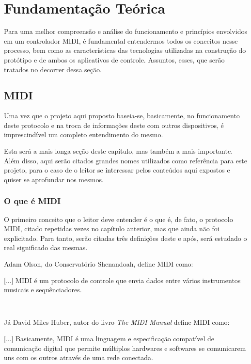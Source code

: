 
\chapter{Fundamentação Teórica}
\label{chap:fundamentacaoTeorica}

    Para uma melhor compreensão e análise do funcionamento e princípios envolvidos em um controlador MIDI, é fundamental entendermos todos os conceitos nesse processo, bem como as características das tecnologias utilizadas na construção do protótipo e de ambos os aplicativos de controle. Assuntos, esses, que serão tratados no decorrer dessa seção.

    \section{MIDI}

        Uma vez que o projeto aqui proposto baseia-se, basicamente, no funcionamento deste protocolo e na troca de informações deste com outros dispositivos, é imprescindível um completo entendimento do mesmo.

        Esta será a mais longa seção deste capítulo, mas também a mais importante. Além disso, aqui serão citados grandes nomes utilizados como referência para este projeto, para o caso de o leitor se interessar pelos conteúdos aqui expostos e quiser se aprofundar nos mesmos.

        \subsection{O que é MIDI}

            O primeiro conceito que o leitor deve entender é o que é, de fato, o protocolo MIDI, citado repetidas vezes no capítulo anterior, mas que ainda não foi explicitado. Para tanto, serão citadas três definições deste e após, será estudado o real significado das mesmas.

            Adam Olson, do Conservatório Shenandoah, define MIDI como: \epigraph{[...] MIDI é um protocolo de controle que envia dados entre vários instrumentos musicais e sequênciadores.}{~\cite{McGuire}}

            Já David Miles Huber, autor do livro \textit{The MIDI Manual} define MIDI como: \epigraph{[...] Basicamente, MIDI é uma linguagem e especificação compatível de comunicação digital que permite múltiplos hardwares e softwares se comunicarem uns com os outros através de uma rede conectada.}{~\cite{Huber}}

